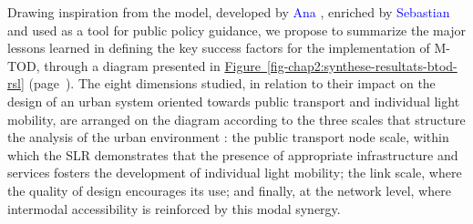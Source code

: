 \begin{refsegment}
Drawing inspiration from the  model, developed by \textcolor{blue}{Ana} \textcolor{blue}{\textcite[12]{gil_sola_negotiating_2019}}, enriched by \textcolor{blue}{Sebastian} \textcolor{blue}{\textcite[8-9]{seisenberger_engaging_2023}} and used as a tool for public policy guidance, we propose to summarize the major lessons learned in defining the key success factors for the implementation of \acrshort{M-TOD}, through a diagram presented in \hyperref[fig-chap2:synthese-resultats-btod-rsl]{Figure~\ref{fig-chap2:synthese-resultats-btod-rsl}} (page~\pageref{fig-chap2:synthese-resultats-btod-rsl}). The eight dimensions studied, in relation to their impact on the design of an urban system oriented towards public transport and individual light mobility, are arranged on the diagram according to the three scales that structure the analysis of the urban environment \textcolor{blue}{\autocite[294]{zhang_built_2023}}: the public transport node scale, within which the \acrshort{SLR} demonstrates that the presence of appropriate infrastructure and services fosters the development of individual light mobility; the link scale, where the quality of design encourages its use; and finally, at the network level, where intermodal accessibility is reinforced by this modal synergy.%


\end{refsegment}
